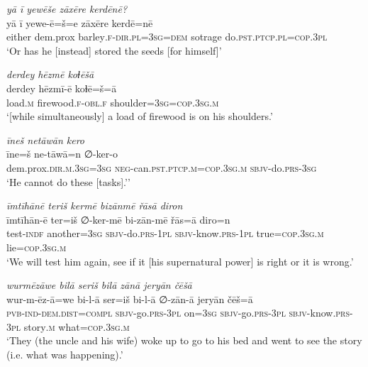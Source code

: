 \ea \label{ŽP.45}
\textit{yā ī yewēše zāxēre kerdēnē?} \\ 
\gll yā ī yewe-ē=š=e zāxēre kerdē=nē \\ 
 either dem.prox barley\textsc{.f}\textsc{-dir}\textsc{.pl}\textsc{=3sg}\textsc{=dem} sotrage do\textsc{.pst}\textsc{.ptcp}\textsc{.pl}\textsc{=cop}\textsc{.3pl} \\ 
\glt `Or has he [instead] stored the seeds [for himself]'
\z 
 
\ea \label{ŽP.47}
\textit{derdey hēzmē koɫēšā} \\ 
\gll derdey hēzmī-ē koɫē=š=ā \\ 
 load\textsc{.m} firewood\textsc{.f}\textsc{-obl}\textsc{.f} shoulder\textsc{=3sg}\textsc{=cop}\textsc{.3sg}\textsc{.m} \\ 
\glt `[while simultaneously] a load of firewood is on his shoulders.'
\z 
 
\ea \label{ŽP.49}
\textit{īneš netāwān kero} \\ 
\gll īne=š ne-tāwā=n ∅-ker-o \\ 
 dem.prox\textsc{.dir}\textsc{.m}\textsc{.3sg}\textsc{=3sg} \textsc{neg-}can\textsc{.pst}\textsc{.ptcp}\textsc{.m}\textsc{=cop}\textsc{.3sg}\textsc{.m} \textsc{sbjv-}do\textsc{.prs}\textsc{-3sg} \\ 
\glt `He cannot do these [tasks].’'
\z 
 
\ea \label{ŽP.64}
\textit{īmtīhānē teriš kermē bizānmē řāsā diron} \\ 
\gll īmtīhān-ē ter=iš ∅-ker-mē bi-zān-mē řās=ā diro=n \\ 
 test\textsc{-indf} another\textsc{=3sg} \textsc{sbjv-}do\textsc{.prs}\textsc{-1pl} \textsc{sbjv-}know\textsc{.prs}\textsc{-1pl} true\textsc{=cop}\textsc{.3sg}\textsc{.m} lie\textsc{=cop}\textsc{.3sg}\textsc{.m} \\ 
\glt `We will test him again, see if it [his supernatural power] is right or it is wrong.'
\z 
 
\ea \label{ŽP.67}
\textit{wurmēzāwe bilā seriš bilā zānā jeryān čēšā} \\ 
\gll wur-m-ēz-ā=we bi-l-ā ser=iš bi-l-ā ∅-zān-ā jeryān čēš=ā \\ 
 \textsc{pvb-}\textsc{ind-}\textsc{dem.dist}\textsc{=compl} \textsc{sbjv-}go\textsc{.prs}\textsc{-3pl} on\textsc{=3sg} \textsc{sbjv-}go\textsc{.prs}\textsc{-3pl} \textsc{sbjv-}know\textsc{.prs}\textsc{-3pl} story\textsc{.m} what\textsc{=cop}\textsc{.3sg}\textsc{.m} \\ 
\glt `They (the uncle and his wife) woke up to go to his bed and went to see the story (i.e. what was happening).'
\z 
 
